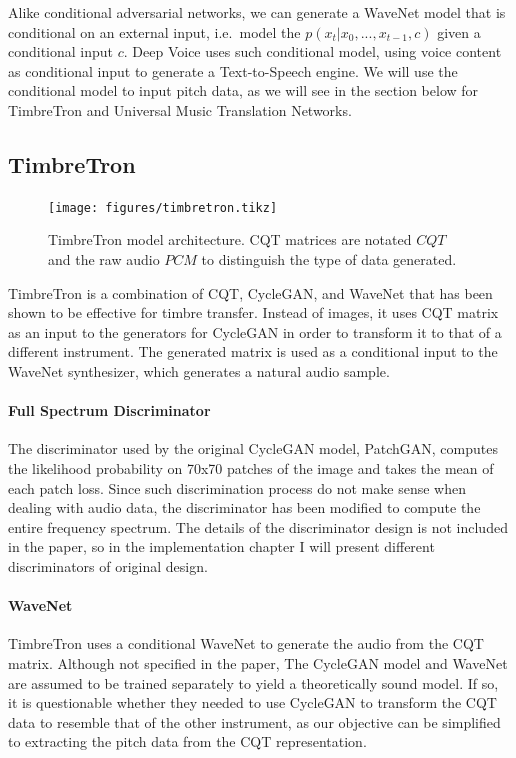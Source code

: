 \documentclass[12pt,a4paper,]{report}
\begin{document}
Alike conditional adversarial networks, we can generate a WaveNet model
that is conditional on an external input, i.e.~model the
\(p(x_t | x_0, ..., x_{t-1}, c)\) given a conditional input \(c\). Deep
Voice uses such conditional model, using voice content as conditional
input to generate a Text-to-Speech engine. We will use the conditional
model to input pitch data, as we will see in the section below for
TimbreTron and Universal Music Translation Networks.

\hypertarget{timbretron}{%
\subsection{TimbreTron}\label{timbretron}}

\begin{figure}[h]
    \texttt{[image: figures/timbretron.tikz]}
    \centering
    \caption{TimbreTron model architecture. CQT matrices are notated $CQT$ and the raw audio $PCM$ to distinguish the type of data generated.} \label{fig:timbretron}
\end{figure}

TimbreTron is a combination of CQT, CycleGAN, and WaveNet that has been
shown to be effective for timbre transfer. Instead of images, it uses
CQT matrix as an input to the generators for CycleGAN in order to
transform it to that of a different instrument. The generated matrix is
used as a conditional input to the WaveNet synthesizer, which generates
a natural audio sample.

\paragraph{Full Spectrum Discriminator}

The discriminator used by the original CycleGAN model, PatchGAN,
computes the likelihood probability on 70x70 patches of the image and
takes the mean of each patch loss. Since such discrimination process do
not make sense when dealing with audio data, the discriminator has been
modified to compute the entire frequency spectrum. The details of the
discriminator design is not included in the paper, so in the
implementation chapter I will present different discriminators of
original design.

\paragraph{WaveNet}

TimbreTron uses a conditional WaveNet to generate the audio from the CQT
matrix. Although not specified in the paper, The CycleGAN model and
WaveNet are assumed to be trained separately to yield a theoretically
sound model. If so, it is questionable whether they needed to use
CycleGAN to transform the CQT data to resemble that of the other
instrument, as our objective can be simplified to extracting the pitch
data from the CQT representation.
\end{document}
